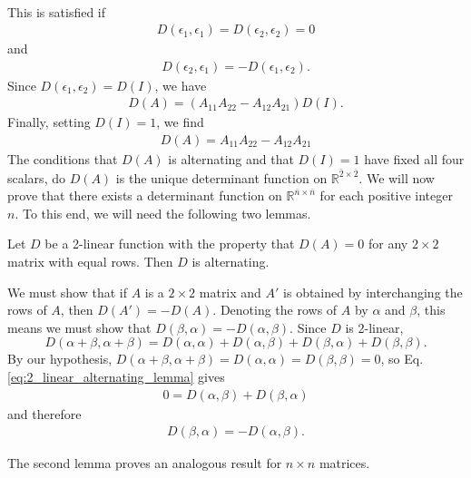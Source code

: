 \documentclass[12pt,letterpaper,reqno]{article}
\numberwithin{equation}{section}
\begin{document}
{\begin{align*}
\end{align*}
This is satisfied if 
\begin{align*}
D(\epsilon_1,\epsilon_1)=D(\epsilon_2,\epsilon_2)=0
\end{align*}
and 
\begin{align*}
	D(\epsilon_2,\epsilon_1)=-D(\epsilon_1,\epsilon_2).
\end{align*}
Since $D(\epsilon_1,\epsilon_2)=D(I)$, we have
\begin{align*}
	D(A)=(A_{11}A_{22}-A_{12}A_{21})D(I).
\end{align*}
Finally, setting $D(I)=1$, we find
\begin{align*}
	D(A)=A_{11}A_{22}-A_{12}A_{21}
\end{align*}
The conditions that $D(A)$ is alternating and that $D(I)=1$ have fixed all four scalars, do $D(A)$ is the unique determinant function on $\mathbb{R}^{\overline{2} \times \overline{2}}$.}
We will now prove that there exists a determinant function on $\mathbb{R}^{\overline{n} \times \overline{n}}$ for each positive integer $n$. To this end, we will need the following two lemmas.

\begin{lem}[$D(A)=0$ implies alternating for $2$-linear functions]
	Let $D$ be a 2-linear function with the property that $D(A)=0$ for any $2 \times 2$ matrix with equal rows. Then $D$ is alternating.
\end{lem}

\begin{pf}
We must show that if $A$ is a $2 \times 2$ matrix and $A'$ is obtained by interchanging the rows of $A$, then $D(A')=-D(A)$. Denoting the rows of $A$ by $\alpha$ and $\beta$, this means we must show that $D(\beta,\alpha)=-D(\alpha,\beta)$. Since $D$ is 2-linear,
\begin{equation}\label{eq:2_linear_alternating_lemma}
	D(\alpha+\beta,\alpha+\beta)=D(\alpha,\alpha)+D(\alpha,\beta)+D(\beta,\alpha)+D(\beta,\beta).
\end{equation}
By our hypothesis, $D(\alpha+\beta,\alpha+\beta)=D(\alpha,\alpha)=D(\beta,\beta)=0$, so Eq. \eqref{eq:2_linear_alternating_lemma} gives
\begin{align*}
	0=D(\alpha,\beta)+D(\beta,\alpha)
\end{align*} 	
and therefore
\begin{align*}
	D(\beta,\alpha)=-D(\alpha,\beta).
\end{align*}
\end{pf}
The second lemma proves an analogous result for $n \times n$ matrices.
\end{document}
